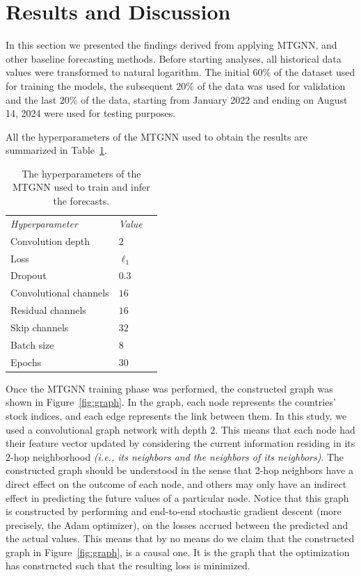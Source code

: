 \section{Results and Discussion}
\label{sec:results}
In this section we presented the findings derived from applying MTGNN, and other baseline forecasting methods. Before starting analyses, all historical data values were transformed to natural logarithm. The initial $60\%$ of 
the dataset used for training the models, the subsequent $20\%$ of the data was used for validation and the last $20\%$ of the data, starting from January 2022 and ending on August 14, 2024 were used for testing purposes.

All the hyperparameters of the MTGNN used to obtain the results are summarized in Table~\ref{tab:hyperparams}. 

\begin{table}[bt]
    \caption{The hyperparameters of the MTGNN used to train and infer the forecasts.}
    \label{tab:hyperparams}
    \centering
    \begin{tabular}{ *3l }           \toprule
    \emph{Hyperparameter}  & \emph{Value} \\ \cmidrule(lr){1-2}
    Convolution depth & $2$ \\
    Loss & $\ell_1$ \\
    Dropout & $0.3$ \\
    Convolutional channels & $16$ \\
    Residual channels & $16$ \\
    Skip channels & $32$ \\
    Batch size & $8$ \\ 
    Epochs & $30$ \\
    \bottomrule
    \hline
    \end{tabular}
\end{table}
%

Once the MTGNN training phase was performed, the constructed graph was shown in Figure~\ref{fig:graph}. In the graph, each node represents the countries' stock indices, and each edge represents the link between them.
In this study, we used a convolutional graph network with depth $2$. This means that each node had their feature vector updated by considering the current information 
residing in its $2$-hop neighborhood \textit{(i.e., its neighbors and the neighbors of its neighbors)}.
The constructed graph should be understood in the sense that 2-hop neighbors have a direct effect 
on the outcome of each node, and others may only have an indirect effect in predicting the future 
values of a particular node. Notice that this graph is constructed by performing and end-to-end 
stochastic gradient descent (more precisely, the Adam optimizer), on the losses accrued between 
the predicted and the actual values. This means that by no means do we claim that the constructed 
graph in Figure~\ref{fig:graph}, is a causal one. It is the graph that the optimization has 
constructed such that the resulting loss is minimized. 

